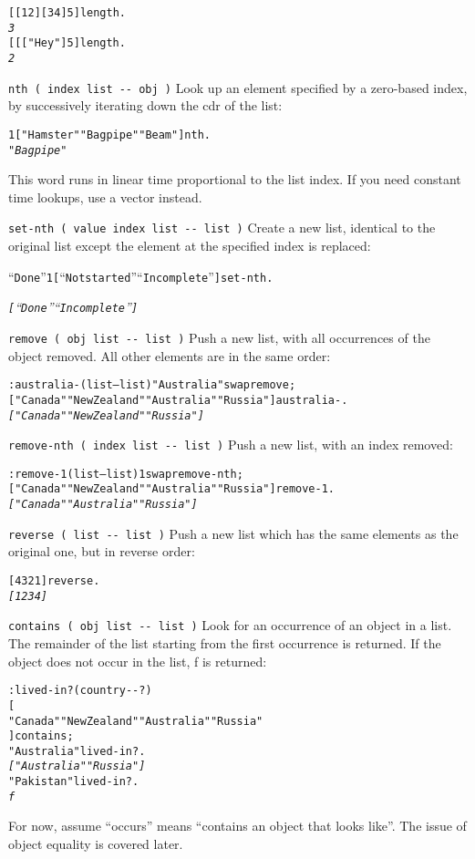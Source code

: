 \documentclass[english]{article}
\begin{document}
\begin{alltt}
{[} {[} 1 2 {]} {[} 3 4 {]} 5 {]} length .
\emph{3}
{[} {[} {[} "Hey" {]} 5 {]} length .
\emph{2}
\end{alltt}
\texttt{nth ( index list -{}- obj )} Look up an element specified
by a zero-based index, by successively iterating down the cdr of the
list:

\begin{alltt}
1 {[} "Hamster" "Bagpipe" "Beam" {]} nth .
\emph{"Bagpipe"}
\end{alltt}
This word runs in linear time proportional to the list index. If you
need constant time lookups, use a vector instead.

\texttt{set-nth ( value index list -{}- list )} Create a new list,
identical to the original list except the element at the specified
index is replaced:

\begin{alltt}
{}``Done'' 1 {[} {}``Not started'' {}``Incomplete'' {]} set-nth .

\emph{{[} {}``Done'' {}``Incomplete'' {]}}
\end{alltt}
\texttt{remove ( obj list -{}- list )} Push a new list, with all occurrences
of the object removed. All other elements are in the same order:

\begin{alltt}
: australia- ( list -- list ) "Australia" swap remove ;
{[} "Canada" "New Zealand" "Australia" "Russia" {]} australia- .
\emph{{[} "Canada" "New Zealand" "Russia" {]}}
\end{alltt}
\texttt{remove-nth ( index list -{}- list )} Push a new list, with
an index removed:

\begin{alltt}
: remove-1 ( list -- list ) 1 swap remove-nth ;
{[} "Canada" "New Zealand" "Australia" "Russia" {]} remove-1 .
\emph{{[} "Canada" "Australia" "Russia" {]}}
\end{alltt}
\texttt{reverse ( list -{}- list )} Push a new list which has the
same elements as the original one, but in reverse order:

\begin{alltt}
{[} 4 3 2 1 {]} reverse .
\emph{{[} 1 2 3 4 {]}}
\end{alltt}
\texttt{contains ( obj list -{}- list )} Look for an occurrence of
an object in a list. The remainder of the list starting from the first
occurrence is returned. If the object does not occur in the list,
f is returned:

\begin{alltt}
: lived-in? ( country -{}- ? )
    {[}
        "Canada" "New Zealand" "Australia" "Russia"
    {]} contains ;
"Australia" lived-in? .
\emph{{[} "Australia" "Russia" {]}}
"Pakistan" lived-in? .
\emph{f}
\end{alltt}
For now, assume {}``occurs'' means {}``contains an object that
looks like''. The issue of object equality is covered later.
\end{document}
